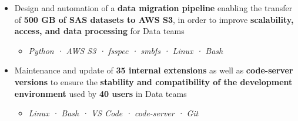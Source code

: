 \documentclass[10pt,english,french]{article}
\begin{document}
\begin{itemize}[leftmargin=0.5cm, label=\textbullet, itemsep=0.0625em]
    \item Design and automation of a \textbf{data migration pipeline} enabling the
          transfer of \textbf{500\raisebox{0.20ex}{\small +} GB of SAS datasets to AWS
              S3}, in order to improve \textbf{scalability, access, and data processing} for
          Data teams
          \begin{itemize}[leftmargin=0.25cm,label=\textendash,itemsep=0em,topsep=0.2em]
              \item \textit{\fontsize{10pt}{9pt}\selectfont Python · AWS S3 · fsspec · smbfs · Linux · Bash}
          \end{itemize}


    \item Maintenance and update of \textbf{35\raisebox{0.20ex}{\small +} internal
              extensions} as well as \textbf{code-server versions} to ensure the
          \textbf{stability and compatibility of the development environment} used by
          \textbf{40\raisebox{0.20ex}{\small +} users} in Data teams
          \begin{itemize}[leftmargin=0.25cm,label=\textendash,itemsep=0em,topsep=0.2em]
              \item \textit{\fontsize{10pt}{9pt}\selectfont Linux · Bash · VS Code · code-server · Git}
          \end{itemize}

\end{itemize}
\end{document}

